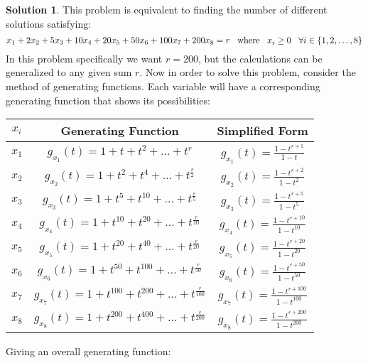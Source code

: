 \documentclass[12pt, letterpaper, onecolumn, conference, final]{IEEEtran}
\theoremstyle{definition}
\newtheorem*{solution*}{Solution}
\theoremstyle{plain}
\begin{document}
\vspace{.3cm}
\begin{solution*}
This problem is equivalent to finding the number of different solutions satisfying:
\begin{equation*}
x_1 + 2x_2 + 5x_3 + 10x_4 + 20x_5 + 50x_6 + 100x_7 + 200x_8 = r \hspace{.3cm} \text{where} \hspace{.3cm} x_i \geq 0 \hspace{.3cm} \forall i \in \{1,2,\dots,8\} 
\end{equation*}
In this problem specifically we want $r=200$, but the calculations can be generalized to any given sum $r$. Now in order to solve this problem, consider the method of generating functions. Each variable will have a corresponding generating function that shows its possibilities:
\begin{center}
\def\arraystretch{2}
\begin{tabular}{| c | c | c |}
\hline
$x_i$ & Generating Function & Simplified Form \\ \hline
$x_1$ & $g_{x_1}(t) = 1 + t + t^2 + \dots + t^r$ & $g_{x_1}(t) = \frac{1 - t^{r+1}}{1-t}$ \\ \hline
$x_2$ & $g_{x_2}(t) = 1 + t^2 + t^4 + \dots + t^\frac{r}{2}$ & $g_{x_2}(t) = \frac{1 - t^{r+2}}{1-t^2}$ \\ \hline
$x_3$ & $g_{x_3}(t) = 1 + t^5 + t^{10} + \dots + t^\frac{r}{5}$ & $g_{x_3}(t) = \frac{1 - t^{r+5}}{1-t^5}$ \\ \hline
$x_4$ & $g_{x_4}(t) = 1 + t^{10} + t^{20} + \dots + t^\frac{r}{10}$ & $g_{x_4}(t) = \frac{1 - t^{r+10}}{1-t^{10}}$ \\ \hline
$x_5$ & $g_{x_5}(t) = 1 + t^{20} + t^{40} + \dots + t^\frac{r}{20}$ & $g_{x_5}(t) = \frac{1 - t^{r+20}}{1-t^{20}}$ \\ \hline
$x_6$ & $g_{x_6}(t) = 1 + t^{50} + t^{100} + \dots + t^\frac{r}{50}$ & $g_{x_6}(t) = \frac{1 - t^{r+50}}{1-t^{50}}$ \\ \hline
$x_7$ & $g_{x_7}(t) = 1 + t^{100} + t^{200} + \dots + t^\frac{r}{100}$ & $g_{x_7}(t) = \frac{1 - t^{r+100}}{1-t^{100}}$ \\ \hline
$x_8$ & $g_{x_8}(t) = 1 + t^{200} + t^{400} + \dots + t^\frac{r}{200}$ & $g_{x_8}(t) = \frac{1 - t^{r+200}}{1-t^{200}}$ \\ \hline
\end{tabular}
\end{center}
Giving an overall generating function:
\begin{equation*}

\end{equation*}
\end{solution*}
\end{document}
